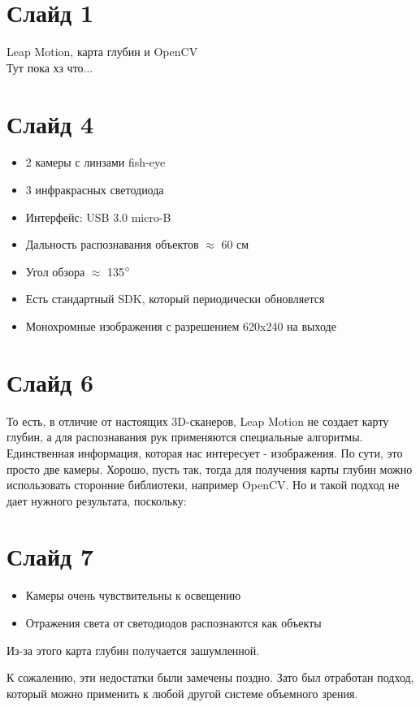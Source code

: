 \documentclass{report}
\begin{document}
    \section*{Слайд 1}
        Leap Motion, карта глубин и OpenCV\\
        Тут пока хз что...

    \section*{Слайд 4}
        \begin{itemize}
			\item 2 камеры с линзами fish-eye
			\item 3 инфракрасных светодиода
			\item Интерфейс: USB 3.0 micro-B
			\item Дальность распознавания объектов $\approx$ 60 см
			\item Угол обзора $\approx$ 135$\degree$
			\item Есть стандартный SDK, который периодически обновляется
			\item Монохромные изображения с разрешением 620x240 на выходе
		\end{itemize}
		
	\section*{Слайд 6}
	    То есть, в отличие от настоящих 3D-сканеров, Leap Motion
	    не создает карту глубин, а для распознавания рук применяются
	    специальные алгоритмы. Единственная информация, которая нас
	    интересует - изображения. По сути, это просто две камеры.
	    Хорошо, пусть так, тогда для получения карты глубин можно
	    использовать сторонние библиотеки, например OpenCV.
	    Но и такой подход не дает нужного результата, поскольку:
	    
	\section*{Слайд 7}
    	\begin{itemize}
			\item Камеры очень чувствительны к освещению
			\item Отражения света от светодиодов распознаются как объекты
		\end{itemize}
	    Из-за этого карта глубин получается зашумленной.
	    
	    К сожалению, эти недостатки были замечены поздно. Зато был отработан
	    подход, который можно применить к любой другой системе объемного зрения.
\end{document}
